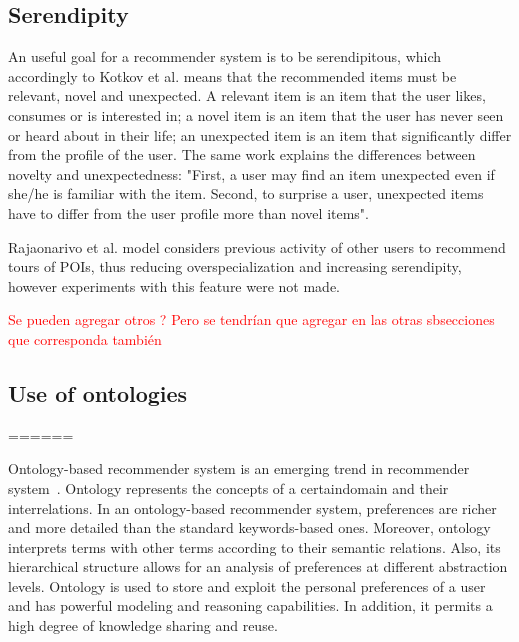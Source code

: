 

\subsection{Serendipity}

An useful goal for a recommender system is to be serendipitous, which accordingly to Kotkov et al. \cite{kotkov2016survey} means that the recommended items must be relevant, novel and unexpected. A relevant item is an item that the user likes, consumes or is interested in; a novel item is an item that the user has never seen or heard about in their life; an unexpected item is an item that significantly differ from the profile of the user. The same work explains the differences between novelty and unexpectedness: "First, a user may find an item unexpected even if she/he is familiar with the item. Second, to surprise a user, unexpected items have to differ from the user profile more than novel items".


Rajaonarivo et al. \cite{rajaonarivo2019rec} model considers previous activity of other users to recommend tours of POIs, thus reducing overspecialization and increasing serendipity, however experiments with this feature were not made.

\textcolor{red}{Se pueden agregar otros ? Pero se tendrían que agregar en las otras sbsecciones que corresponda también}

\subsection{Use of ontologies}

======

Ontology-based  recommender  system  is  an  emerging  trend  in recommender   system~\cite{borras2014intelligent,yochum2020linked}.   Ontology represents   the   concepts   of   a certaindomain   and   their interrelations. In   an   ontology-based   recommender   system, preferences  are  richer  and  more  detailed  than  the  standard keywords-based ones. Moreover, ontology interprets terms with other  terms  according  to  their  semantic  relations.  Also,  its hierarchical  structure  allows  for  an  analysis  of  preferences  at different abstraction levels. Ontology is used to store and exploit the personal preferences of a user and has powerful modeling and reasoning  capabilities.  In  addition,  it  permits  a  high  degree  of knowledge sharing and reuse.


